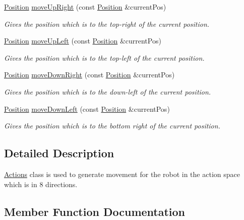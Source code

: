 \begin{DoxyCompactItemize}
\hyperlink{structPosition}{Position} \hyperlink{classActions_a5d57168e20c11b1b07c7f1cbc0419284}{move\+Up\+Right} (const \hyperlink{structPosition}{Position} \&current\+Pos)
\begin{DoxyCompactList}\small\item\em Gives the position which is to the top-\/right of the current position. \end{DoxyCompactList}\item 
\hyperlink{structPosition}{Position} \hyperlink{classActions_a86b92a73287773ba08356fbb999fcc61}{move\+Up\+Left} (const \hyperlink{structPosition}{Position} \&current\+Pos)
\begin{DoxyCompactList}\small\item\em Gives the position which is to the top-\/left of the current position. \end{DoxyCompactList}\item 
\hyperlink{structPosition}{Position} \hyperlink{classActions_a01769dc63522cc613e8050c2266b0dbf}{move\+Down\+Right} (const \hyperlink{structPosition}{Position} \&current\+Pos)
\begin{DoxyCompactList}\small\item\em Gives the position which is to the down-\/left of the current position. \end{DoxyCompactList}\item 
\hyperlink{structPosition}{Position} \hyperlink{classActions_a7ff875712d63d34aeb9760672d88e05a}{move\+Down\+Left} (const \hyperlink{structPosition}{Position} \&current\+Pos)
\begin{DoxyCompactList}\small\item\em Gives the position which is to the bottom right of the current position. \end{DoxyCompactList}\end{DoxyCompactItemize}


\subsection{Detailed Description}
\hyperlink{classActions}{Actions} class is used to generate movement for the robot in the action space which is in 8 directions. 

\subsection{Member Function Documentation}
